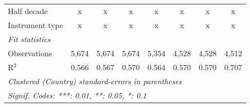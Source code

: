 \begin{tabular}{lccccccc}
   Half decade                                                                               & x             & x            & x             & x             & x             & x             & x\\  
   Instrument type                                                                           & x             & x            & x             & x             & x             & x             & x\\  
   \midrule \emph{Fit statistics}\\
   Observations                                                                              & 5,674         & 5,674        & 5,674         & 5,354         & 4,528         & 4,528         & 4,512\\  
   R$^2$                                                                                     & 0.566         & 0.567        & 0.570         & 0.564         & 0.570         & 0.570         & 0.707\\  
   \midrule
   \multicolumn{8}{l}{\emph{Clustered (Country) standard-errors in parentheses}}\\
   \multicolumn{8}{l}{\emph{Signif. Codes: ***: 0.01, **: 0.05, *: 0.1}}\\
\end{tabular}
\par\endgroup


